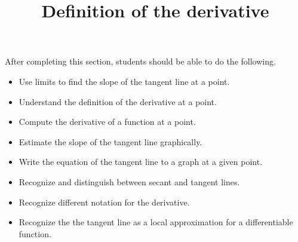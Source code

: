 \documentclass{ximera}
\title{Definition of the derivative}
\begin{document}
\begin{abstract}
\end{abstract}

\maketitle

\begin{sectionOutcomes}

After completing this section, students should be able to do the following.

\begin{itemize}
\item Use limits to find the slope of the tangent line at a point.
\item Understand the definition of the derivative at a point.
\item Compute the derivative of a function at a point.
\item Estimate the slope of the tangent line graphically.
\item Write the equation of the tangent line to a graph at a given point.
\item Recognize and distinguish between secant and tangent lines.
\item Recognize different notation for the derivative.
\item Recognize the the tangent line as a local approximation for a
  differentiable function.
\end{itemize}

\end{sectionOutcomes}
\end{document}
